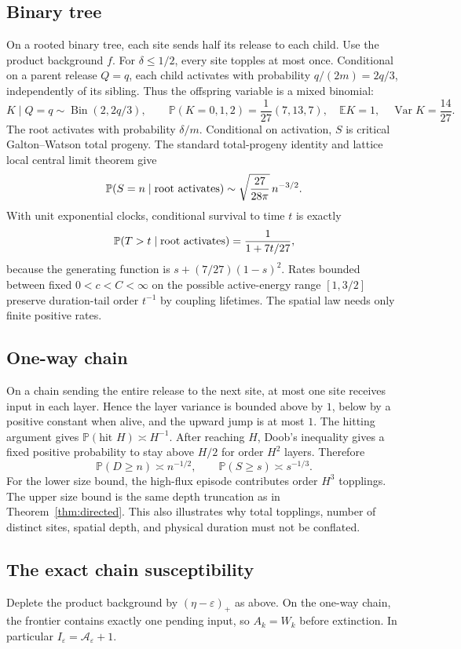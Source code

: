 \documentclass[11pt]{article}
\numberwithin{equation}{section}
\theoremstyle{definition}
\newcommand{\E}{\mathbb E}
\newcommand{\Prob}{\mathbb P}
\newcommand{\Var}{\operatorname{Var}}
\begin{document}
\subsection{Binary tree}
On a rooted binary tree, each site sends half its release to each child. Use the product background $f$. For $\delta\le1/2$, every site topples at most once. Conditional on a parent release $Q=q$, each child activates with probability $q/(2m)=2q/3$, independently of its sibling. Thus the offspring variable is a mixed binomial:
\[
 K\mid Q=q\sim\operatorname{Bin}(2,2q/3),\qquad
 \Prob(K=0,1,2)=\frac1{27}(7,13,7),
 \quad \E K=1,\quad\Var K=\frac{14}{27}.
\]
The root activates with probability $\delta/m$. Conditional on activation, $S$ is critical Galton--Watson total progeny. The standard total-progeny identity and lattice local central limit theorem give
\[
 \Prob(S=n\mid\hbox{root activates})
 \sim\sqrt{\frac{27}{28\pi}}\,n^{-3/2}.
\]
With unit exponential clocks, conditional survival to time $t$ is exactly
\[
 \Prob(T>t\mid\hbox{root activates})=\frac1{1+7t/27},
\]
because the generating function is $s+(7/27)(1-s)^2$. Rates bounded between fixed $0<c<C<\infty$ on the possible active-energy range $[1,3/2]$ preserve duration-tail order $t^{-1}$ by coupling lifetimes. The spatial law needs only finite positive rates.

\subsection{One-way chain}
On a chain sending the entire release to the next site, at most one site receives input in each layer. Hence the layer variance is bounded above by $1$, below by a positive constant when alive, and the upward jump is at most $1$. The hitting argument gives $\Prob(\text{hit }H)\asymp H^{-1}$. After reaching $H$, Doob's inequality gives a fixed positive probability to stay above $H/2$ for order $H^2$ layers. Therefore
\[
 \Prob(D\ge n)\asymp n^{-1/2},\qquad
 \Prob(S\ge s)\asymp s^{-1/3}.
\]
For the lower size bound, the high-flux episode contributes order $H^3$ topplings. The upper size bound is the same depth truncation as in Theorem~\ref{thm:directed}. This also illustrates why total topplings, number of distinct sites, spatial depth, and physical duration must not be conflated.

\subsection{The exact chain susceptibility}\label{sec:chain-response}
Deplete the product background by $(\eta-\varepsilon)_+$ as above. On the one-way chain, the frontier contains exactly one pending input, so $A_k=W_k$ before extinction. In particular $I_\varepsilon=\mathcal A_\varepsilon+1$.
\end{document}
